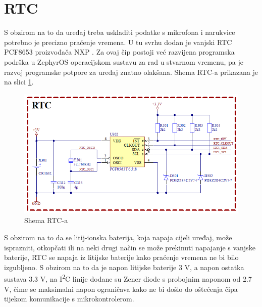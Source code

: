 \section{RTC}

S obzirom na to da uređaj treba uskladiti podatke s mikrofona i narukvice potrebno je precizno praćenje vremena. U tu svrhu dodan je vanjski RTC PCF8653 proizvođača NXP \cite{nxp:pcf8654}. Za ovaj čip postoji već razvijena programska podrška u ZephyrOS operacijskom sustavu za rad u stvarnom vremenu, pa je razvoj programske potpore za uređaj znatno olakšana. Shema RTC-a prikazana je na slici \ref{slk:RTC}.
\begin{figure}[hbt]
    \centering
    \includegraphics[width=\textwidth]{Figures/RTC.png}
    \caption{Shema RTC-a}
    \label{slk:RTC}
\end{figure}
S obzirom na to da se litij-ionska baterija, koja napaja cijeli uređaj, može isprazniti, otkopčati ili na neki drugi način se može prekinuti napajanje s vanjske baterije, RTC se napaja iz litijske baterije kako praćenje vremena ne bi bilo izgubljeno. S obzirom na to da je napon litijske baterije 3 V, a napon ostatka sustava 3.3 V, na I\textsuperscript{2}C linije dodane su Zener diode s probojnim naponom od 2.7 V, čime se maksimalni napon ograničava kako ne bi došlo do oštećenja čipa tijekom komunikacije s mikrokontrolerom.

